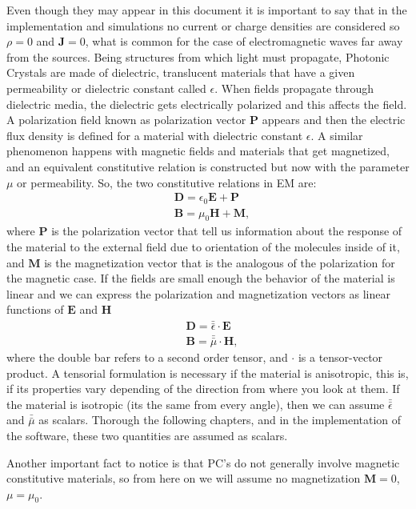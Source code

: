 Even though they may appear in this document it is important to say that in the implementation and simulations no current or charge densities are considered so $\rho = 0$ and $\mathbf{J} =0$, what is common for the case of electromagnetic waves far away from the sources.
Being structures from which light must propagate, Photonic Crystals are made of dielectric, translucent  materials that have a given permeability or dielectric constant called $\epsilon$. When fields propagate through dielectric media, the dielectric gets electrically polarized and this affects the field. A polarization field known as polarization vector $\mathbf{P}$ appears and then the electric flux density is defined for a material with dielectric constant $\epsilon$.  A similar phenomenon happens with magnetic fields and materials that get magnetized, and an equivalent constitutive relation is constructed but now with the parameter $\mu$ or permeability.
So, the two constitutive relations in EM are:
\begin{align}
&\mathbf{D} = \epsilon_0 \mathbf{E} + \mathbf{P}\\
&\mathbf{B} = \mu_0  \mathbf{H} + \mathbf{M},
\end{align}
where $\mathbf{P}$ is the polarization vector that tell us information about the response of the material to the external field due to orientation of the molecules inside of it, and $\mathbf{M}$ is the magnetization vector that is the analogous of the polarization for the magnetic case. If the fields are small enough the behavior of the material is linear and we can express the polarization and magnetization vectors as linear functions of $\mathbf{E}$ and $\mathbf{H}$
\begin{align}
&\mathbf{D} = \bar{\bar{\epsilon}} \cdot \mathbf{E}\\
&\mathbf{B} = \bar{\bar{\mu}} \cdot \mathbf{H},
\end{align}
where the double bar refers to a second order tensor, and $\cdot$ is a tensor-vector product. A tensorial formulation is necessary if the material is anisotropic, this is, if its properties vary depending of the direction from where you look at them. If the material is isotropic (its the same from every angle), then we can assume $\bar{\bar{\epsilon}}$ and $\bar{\bar{\mu}}$ as scalars. Thorough the following chapters, and in the implementation of the software, these two quantities are assumed as scalars.

Another important fact to notice is that PC's do not generally involve magnetic constitutive materials, so from here on we will assume no magnetization $\mathbf{M} = 0$, $\mu = \mu_0$. 

